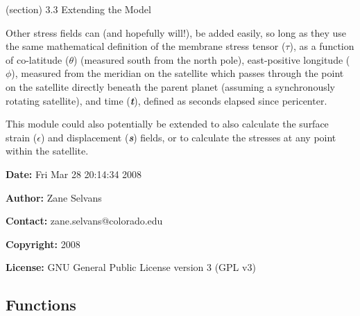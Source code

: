   (section) 3.3 Extending the Model

    Other stress fields can (and hopefully will!), be added easily, so long
    as they use the same mathematical definition of the membrane stress 
    tensor (\(\tau\)), as a function of co-latitude (\(\theta\)) (measured 
    south from the north pole), east-positive longitude (\(\phi\)), 
    measured from the meridian on the satellite which passes through the 
    point on the satellite directly beneath the parent planet (assuming a 
    synchronously rotating satellite), and time (\textbf{\textit{t}}), 
    defined as seconds elapsed since pericenter.

    This module could also potentially be extended to also calculate the 
    surface strain (\(\epsilon\)) and displacement (\textbf{\textit{s}}) 
    fields, or to calculate the stresses at any point within the satellite.

\textbf{Date:} Fri Mar 28 20:14:34 2008



\textbf{Author:} Zane Selvans



\textbf{Contact:} zane.selvans@colorado.edu



\textbf{Copyright:} 2008



\textbf{License:} GNU General Public License version 3 (GPL v3)





  \subsection{Functions}

    \label{satstress:SatStress:nvf2dict}

    \vspace{0.5ex}

